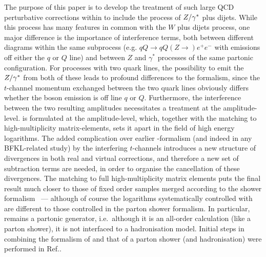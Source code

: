 		The purpose of this paper is to develop the treatment of such large QCD
		perturbative corrections within \hej to include the process of $Z/\gamma^*$ plus
		dijets. While this process has many features in
		common with the $W$ plus dijets process, one major difference is the
		importance of interference terms, both between different diagrams within the
		same subprocess (e.g. $qQ\to qQ(Z\to)e^+e^-$ with emissions off either the $q$ or
		$Q$ line) and between $Z$ and $\gamma^*$
		processes of the same partonic configuration. For processes with two quark
		lines, the possibility to emit the $Z/\gamma^*$ from both of these leads to profound
		differences to the formalism, since the $t$-channel momentum exchanged
		between the two quark lines obviously differs whether the boson emission is
		off line $q$ or $Q$. Furthermore, the interference between the two resulting
		amplitudes necessitates a treatment at the amplitude-level. \hej is
		formulated
		 at the amplitude-level, which, together with the matching to
		 high-multiplicity matrix-elements, sets it apart in the field of
		high energy
		logarithms\cite{Kuraev:1976ge,Balitsky:1978ic,Lonnblad:1992tz,Lavesson:2005xu,Jung:2000hk,Jung:2010si,Colferai:2010wu,Caporale:2012ih,Ducloue:2012bm}. The
		added complication over earlier \hej-formalism (and indeed in any
		BFKL-related study) by the interfering $t$-channels introduces a new structure of divergences in both real and virtual
		corrections, and therefore a new set of subtraction terms are needed, in
		order to
		organise the cancellation of these divergences. The matching to full
		high-multiplicity matrix elements puts the final result much closer to those
		of fixed order samples merged according to the shower
		formalism~\cite{Re:2012zi,Campbell:2013vha,Hoeche:2012yf,Frederix:2015eii}
		--- although of course the logarithms systematically controlled with \hej are
		different to those controlled in the parton shower formalism. In particular,
		\hej remains a partonic generator, i.e.~although it is an all-order
		calculation (like a parton shower), it is not interfaced to a hadronisation
		model. Initial steps in combining the formalism of \hej and that of a parton
		shower (and hadronisation) were performed in Ref.\cite{Andersen:2011zd}.

